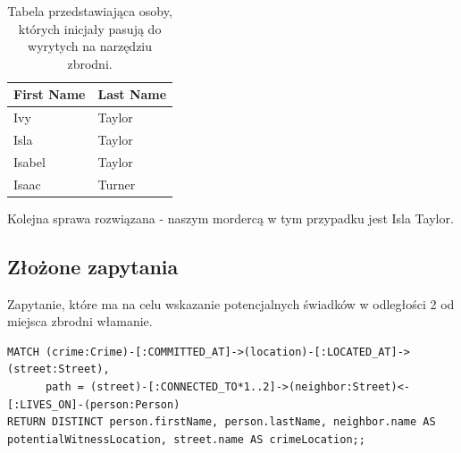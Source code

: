 \documentclass[a4paper,12pt]{article}
\begin{document}
\begin{table}[h!]
\centering
\begin{tabular}{|l|l|}
\hline
\textbf{First Name} & \textbf{Last Name} \\ \hline
Ivy                & Taylor             \\ \hline
Isla               & Taylor             \\ \hline
Isabel             & Taylor             \\ \hline
Isaac              & Turner             \\ \hline
\end{tabular}
\caption{Tabela przedstawiająca osoby, których inicjały pasują do wyrytych na narzędziu zbrodni.}
\label{tab:names}
\end{table}
\newpage

Kolejna sprawa rozwiązana - naszym mordercą w tym przypadku jest Isla Taylor.

\subsection{Złożone zapytania}

Zapytanie, które ma na celu wskazanie potencjalnych świadków w odległości 2 od miejsca zbrodni włamanie.

\begin{center}
\begin{minipage}{0.8\linewidth}
\begin{lstlisting}[language=Cypher, basicstyle=\small, breaklines=true]
MATCH (crime:Crime)-[:COMMITTED_AT]->(location)-[:LOCATED_AT]->(street:Street),
      path = (street)-[:CONNECTED_TO*1..2]->(neighbor:Street)<-[:LIVES_ON]-(person:Person)
RETURN DISTINCT person.firstName, person.lastName, neighbor.name AS potentialWitnessLocation, street.name AS crimeLocation;;
\end{lstlisting}
\end{minipage}
\end{center}
\end{document}
